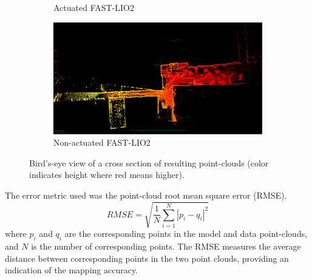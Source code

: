 \documentclass[english, bachelor, utf8]{base/thesis_telematics}
\begin{document}
\begin{figure}[t]
\begin{subfigure}{0.492\columnwidth}
        \caption{Actuated FAST-LIO2}
        \label{fig:act_fast_lio_top}\end{subfigure}
\hfill
\begin{subfigure}{0.492\columnwidth}
        \centering
        \includegraphics[width=\textwidth]{pics/eagle_view/non_lio_top.png}
        \caption{Non-actuated FAST-LIO2}
        \label{fig:non_act_fast_lio_top}
\end{subfigure}
\caption{Bird's-eye view of a cross section of resulting point-clouds (color indicates height where red means higher).}\vspace{-1mm}
\end{figure}

The error metric used was the point-cloud root mean square error (RMSE).
\begin{equation}
    RMSE = \sqrt{\frac{1}{N} \sum_{i=1}^{N} |p_i - q_i|^2}
\end{equation}
where \( p_i \) and \( q_i \) are the corresponding points in the model and data point-clouds, and \( N \) is the number of corresponding points. 
The RMSE measures the average distance between corresponding points in the two point clouds, providing an indication of the mapping accuracy.
\end{document}
